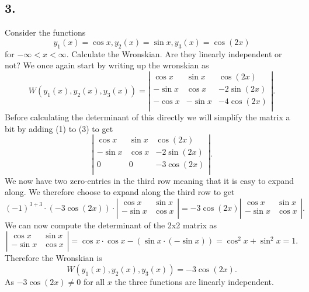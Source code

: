\subsection*{3.} Consider the functions
\[ 
y_1 (x) = \cos x, y_2 (x) = \sin x, y_3(x) = \cos (2x)
\]
for $-\infty < x <\infty $. Calculate the Wronskian. Are they linearly independent or not?
\bigbreak
We once again start by writing up the wronskian as
\[ 
W(y_1(x), y_2(x), y_3(x)) = \left| \begin{array}{ccc}
\cos x & \sin x & \cos(2x) \\
-\sin x & \cos x & -2 \sin(2x)\\
- \cos x & -\sin x & -4 \cos(2x)\\
\end{array} \right|
.\]
Before calculating the determinant of this directly we will simplify the matrix a bit by adding (1) to (3) to get
\[ 
\left| \begin{array}{ccc}
\cos x & \sin x & \cos(2x)\\
- \sin x & \cos x & -2 \sin(2x)\\
0 & 0 & -3 \cos(2x)\\
\end{array} \right|
.\]
We now have two zero-entries in the third row meaning that it is easy to expand along. We therefore choose to expand along the third row to get
\[ 
  (-1)^{3+3} \cdot (-3 \cos(2x)) \cdot \left| \begin{array}{cc}
  \cos x & \sin x\\
  - \sin x &  \cos x\\
  \end{array} \right| = -3 \cos(2x) \left| \begin{array}{cc}
  \cos x & \sin x\\
  - \sin x & \cos x\\
  \end{array} \right|
.\]
We can now compute the determinant of the 2x2 matrix as
\[ 
\left| \begin{array}{cc}
\cos x & \sin x\\
- \sin x & \cos x\\
\end{array} \right| = \cos x \cdot \cos x - (\sin x \cdot (- \sin x)) = \cos^2 x + \sin^2 x = 1
.\]
Therefore the Wronskian is
\[ 
W(y_1(x), y_2(x), y_3(x)) = -3 \cos(2x)
.\]
As $-3 \cos(2x) \neq 0$ for all $x$ the three functions are linearly independent.




